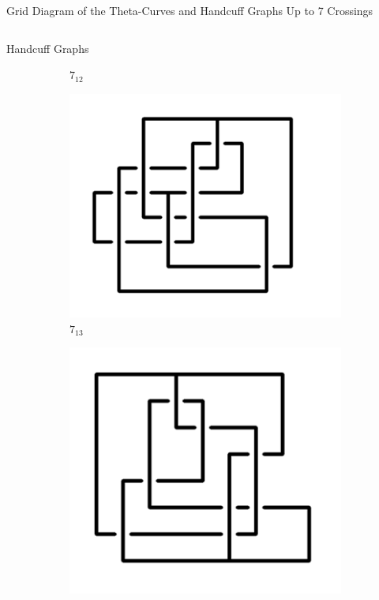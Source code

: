 \documentclass[final]{beamer}
\begin{document}
\begin{frame}[t]
\begin{alertblock}{Grid Diagram of the Theta-Curves and Handcuff Graphs Up to 7 Crossings}
\begin{columns}[t]
\begin{column}{0.5\textwidth}
\begin{alertblock}{Handcuff Graphs}
\begin{figure}
\begin{subfigure}{0.075\textwidth}
    \caption{$7_{12}$} 
    \end{subfigure}
    \begin{subfigure}{0.075\textwidth}
    \includegraphics[width=\columnwidth]{../Midterm_Poster/grid_diagram/handcuff_7_13.png}
    \caption{$7_{13}$} 
    \end{subfigure}
    \begin{subfigure}{0.075\textwidth}
    \includegraphics[width=\columnwidth]{../Midterm_Poster/grid_diagram/handcuff_7_14.png}

\end{subfigure}
\end{figure}
\end{alertblock}
\end{column}
\end{columns}
\end{alertblock}
\end{frame}
\end{document}
